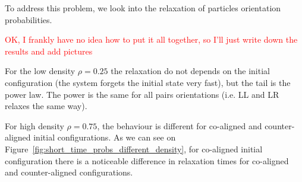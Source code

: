 To address this problem, we look into the relaxation of particles orientation probabilities. 

\textcolor{red}{OK, I frankly have no idea how to put it all together, so I'll just write down the results and add pictures}

For the low density $\rho = 0.25$ the relaxation do not depends on the initial configuration (the system forgets the initial state very fast), but the tail is the power law. The power is the same for all pairs orientations (i.e. LL and LR relaxes the same way).

For high density $\rho = 0.75$, the behaviour is different for co-aligned and counter-aligned initial configurations. As we can see on Figure~\ref{fig:short_time_probs_different_density}, for co-aligned initial configuration there is a noticeable difference in relaxation times for co-aligned and counter-aligned configurations.

